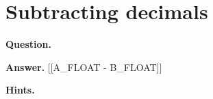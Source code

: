 \documentclass{article}
\begin{document}
\section*{Subtracting decimals}
\textbf{Question.} 

\textbf{Answer.} [[A\_FLOAT - B\_FLOAT]]

\textbf{Hints.}
\begin{itemize}

\end{itemize}
\end{document}
